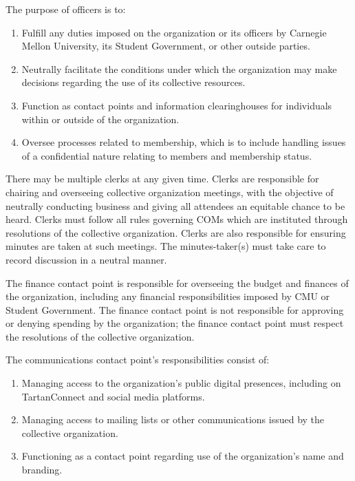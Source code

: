 \documentclass[11pt]{article}
\newcounter{h1}
\newcounter{h2}[h1]
\newcounter{h3}[h2]
\begin{document}


The purpose of officers is to:

\begin{enumerate}
  \item Fulfill any duties imposed on the organization or its officers by Carnegie Mellon University, its Student Government, or other outside parties.  
  \item Neutrally facilitate the conditions under which the organization may make decisions regarding the use of its collective resources.  
  \item Function as contact points and information clearinghouses for individuals within or outside of the organization.  
  \item Oversee processes related to membership, which is to include handling issues of a confidential nature relating to members and membership status.
\end{enumerate}



There may be multiple clerks at any given time. Clerks are responsible for chairing and overseeing collective organization meetings, with the objective of neutrally conducting business and giving all attendees an equitable chance to be heard. Clerks must follow all rules governing COMs which are instituted through resolutions of the collective organization. Clerks are also responsible for ensuring minutes are taken at such meetings. The minutes-taker(s) must take care to record discussion in a neutral manner.


The finance contact point is responsible for overseeing the budget and finances of the organization, including any financial responsibilities imposed by CMU or Student Government. The finance contact point is not responsible for approving or denying spending by the organization; the finance contact point must respect the resolutions of the collective organization.


The communications contact point's responsibilities consist of:

\begin{enumerate}
  \item Managing access to the organization's public digital presences, including on TartanConnect and social media platforms.  
  \item Managing access to mailing lists or other communications issued by the collective organization.  
  \item Functioning as a contact point regarding use of the organization's name and branding.
\end{enumerate}
\end{document}
